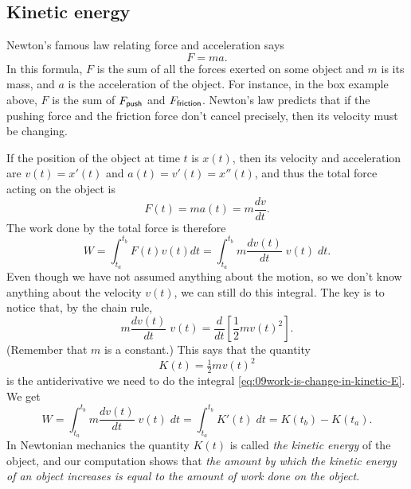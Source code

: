 \subsection{Kinetic energy} %
Newton's famous law relating force and acceleration says
\[
  F=ma.
\]
In this formula, $F$ is the sum of all the forces exerted on some object and 
$m$ is its mass, and $a$ is the acceleration of the object.
For instance, in the box example above, $F$ is the sum of $F_{\sf push}$ and
$F_{\sf friction}$.  Newton's law predicts that if the pushing force and the
friction force don't cancel precisely, then its velocity must be changing.

If the position of the object at time $t$ is $x(t)$, then its velocity and
acceleration are $v(t) = x'(t)$ and $a(t) = v'(t) = x''(t)$, and thus the total
force acting on the object is
\[
F(t) = ma(t) = m \frac{dv}{dt}.
\]
The work done by the total force is therefore
\begin{equation}
  \label{eq:09work-is-change-in-kinetic-E}
  W = \int_{t_a}^{t_b} F(t)v(t)dt
  =\int_{t_a}^{t_b} m \frac{dv(t)}{dt}\;v(t)\;dt.
\end{equation}
Even though we have not assumed anything about the motion, so we don't know
anything about the velocity $v(t)$, we can still do this integral.  The key is
to notice that, by the chain rule,
\[
m \frac{dv(t)}{dt}\;v(t) = \frac{d}{dt}\left[\frac12m v(t)^2\right].
\]
(Remember that $m$ is a constant.)  This says that the quantity
\[
K(t) = \tfrac12 m v(t)^2
\]
is the antiderivative we need to do the integral
\eqref{eq:09work-is-change-in-kinetic-E}.  We get
\[
W = \int_{t_a}^{t_b} m \frac{dv(t)}{dt}\;v(t)\;dt = \int_{t_a}^{t_b} K'(t)\;dt
=K(t_b) - K(t_a).
\]
In Newtonian mechanics the quantity $K(t)$ is called \emph{the kinetic energy}
of the object, and our computation shows that \textit{the amount by which the
kinetic energy of an object increases is equal to the amount of work done on
the object. }

